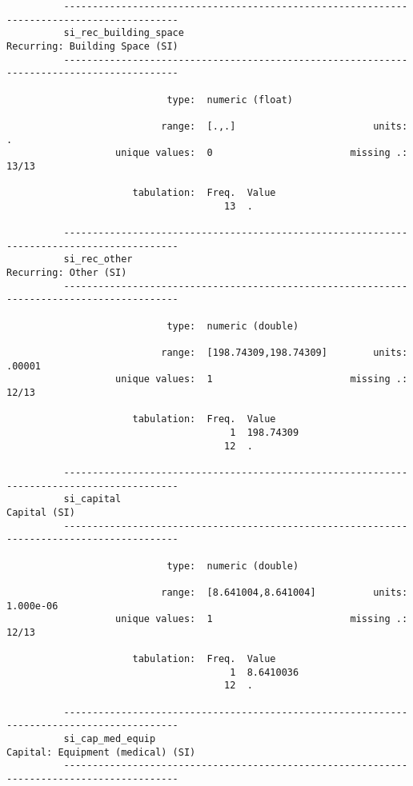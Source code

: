 \documentclass{article}
\begin{document}
\begin{verbatim}
          ------------------------------------------------------------------------------------------
          si_rec_building_space                                       Recurring: Building Space (SI)
          ------------------------------------------------------------------------------------------
          
                            type:  numeric (float)
          
                           range:  [.,.]                        units:  .
                   unique values:  0                        missing .:  13/13
          
                      tabulation:  Freq.  Value
                                      13  .
          
          ------------------------------------------------------------------------------------------
          si_rec_other                                                         Recurring: Other (SI)
          ------------------------------------------------------------------------------------------
          
                            type:  numeric (double)
          
                           range:  [198.74309,198.74309]        units:  .00001
                   unique values:  1                        missing .:  12/13
          
                      tabulation:  Freq.  Value
                                       1  198.74309
                                      12  .
          
          ------------------------------------------------------------------------------------------
          si_capital                                                                    Capital (SI)
          ------------------------------------------------------------------------------------------
          
                            type:  numeric (double)
          
                           range:  [8.641004,8.641004]          units:  1.000e-06
                   unique values:  1                        missing .:  12/13
          
                      tabulation:  Freq.  Value
                                       1  8.6410036
                                      12  .
          
          ------------------------------------------------------------------------------------------
          si_cap_med_equip                                         Capital: Equipment (medical) (SI)
          ------------------------------------------------------------------------------------------
          

\end{verbatim}
\end{document}
